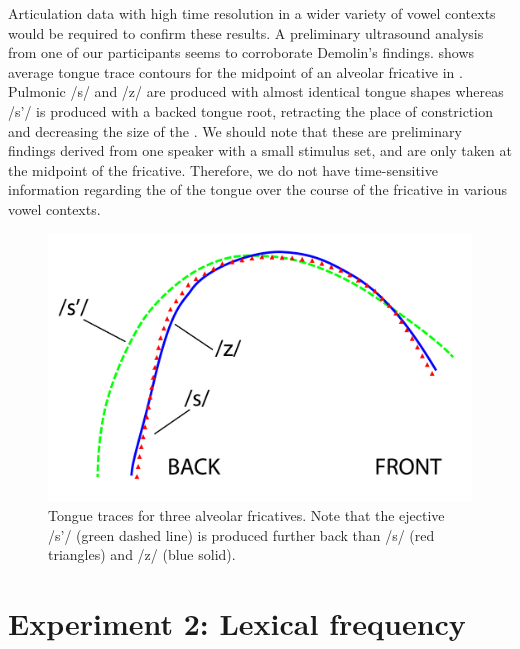 \documentclass[output=paper,newtxmath,modfonts,nonflat,final]{langsci/langscibook}
\begin{document}
Articulation data with high time resolution in a wider variety of vowel contexts would be required to confirm these results. A preliminary ultrasound analysis from one of our participants seems to corroborate Demolin’s findings.  shows average tongue trace contours for the midpoint of an alveolar fricative in . Pulmonic /s/ and /z/ are produced with almost identical tongue shapes whereas /s’/ is produced with a backed tongue root, retracting the place of constriction and decreasing the size of the . We should note that these are preliminary findings derived from one speaker with a small stimulus set, and are only taken at the midpoint of the fricative. Therefore, we do not have time-sensitive information regarding the  of the tongue over the course of the fricative in various vowel contexts.

   

\begin{figure}
\includegraphics[height=0.25\textheight]{figures/fig-moeng-3}
\caption{Tongue traces for three alveolar fricatives. Note that the ejective /s’/ (green dashed line) is produced further back than /s/ (red triangles) and /z/ (blue solid).}
\label{fig:moeng:4}
\end{figure}

\section{Experiment 2: Lexical frequency}\label{sec:moeng:6}
\end{document}
